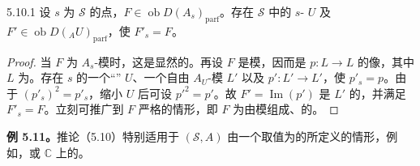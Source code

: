 \begin{SGAresult}{}{5.10.1}
设 $s$ 为 $\mathscr S$ 的点，$F\in\operatorname{ob}D(A_s)_{\mathrm{parf}}$。存在 $\mathscr S$ 中的 $s$- $U$ 及 $F'\in\operatorname{ob}D({}_AU)_{\mathrm{parf}}$，使 $F'_s=F$。
\end{SGAresult}
\begin{proof}
当 $F$ 为 $A_s$-模时，这是显然的。再设 $F$ 是模，因而是 $p:L\to L$ 的像，其中 $L$ 为。存在 $s$ 的一个“” $U$、一个自由 $A_U$-模 $L'$ 以及 $p':L'\to L'$，使 $p'_s=p$。由于 $(p'_s)^2=p'_s$，缩小 $U$ 后可设 $p'^2=p'$。故 $F'=\operatorname{Im}(p')$ 是 $L'$ 的，并满足 $F'_s=F$。立刻可推广到 $F$ 严格的情形，即 $F$ 为由模组成、的。
\end{proof}

\textbf{例 5.11。}推论（5.10）特别适用于 $(\mathscr S,A)$ 由一个取值为的所定义的情形，例如，或 $\mathbb C$ 上的。
